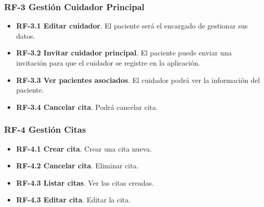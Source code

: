 \subsubsection{RF-3 Gestión Cuidador Principal}
\begin{itemize}
\tightlist 
\item \textbf{RF-3.1 Editar cuidador}. El paciente será el encargado de gestionar sus datos.
\item \textbf{RF-3.2 Invitar cuidador principal}. El paciente puede enviar una invitación para que el cuidador se registre en la aplicación.
\item \textbf{RF-3.3 Ver pacientes asociados}. El cuidador podrá ver la información del paciente.
\item \textbf{RF-3.4 Cancelar cita}. Podrá cancelar cita.
\end{itemize}

\subsubsection{RF-4 Gestión Citas}
\begin{itemize}
\tightlist 
\item \textbf{RF-4.1 Crear cita}. Crear una cita nueva.
\item \textbf{RF-4.2 Cancelar cita}. Eliminar cita.
\item \textbf{RF-4.3 Listar citas}. Ver las citas creadas.
\item \textbf{RF-4.3 Editar cita}. Editar la cita.
\end{itemize}


